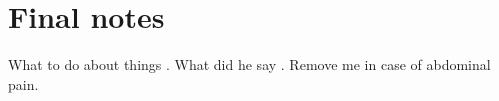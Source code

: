 \documentclass[12pt,chapterheads]{ucsd}
\begin{document}





\appendix
\chapter{Final notes}
What to do about things \cite{Martin_1983}.  What did he say \cite{Rilling_Insel_1999}.
  Remove me in case of abdominal pain.



\singlespace  %
\end{document}

